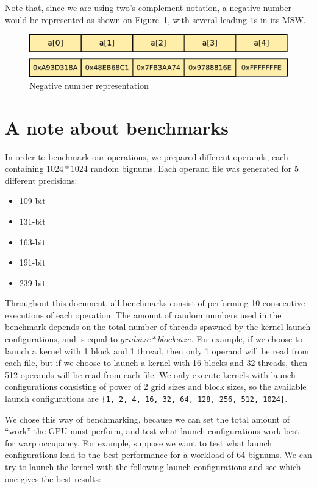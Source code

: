 \documentclass[10pt, a4paper]{report}
\begin{document}
Note that, since we are using two's complement notation, a negative number would
be represented as shown on Figure~\ref{fig:negative_number_representation}, with
several leading \verb+1+s in its MSW.

\begin{figure}[h]
\centering
\includegraphics[scale=0.5]{figs/negative_number_representation}
\caption{Negative number representation}
\label{fig:negative_number_representation}
\end{figure}

\section{A note about benchmarks}
In order to benchmark our operations, we prepared different operands, each
containing $1024*1024$ random bignums.
Each operand file was generated for 5 different precisions:

\begin{itemize}
\item 109-bit
\item 131-bit
\item 163-bit
\item 191-bit
\item 239-bit
\end{itemize}

Throughout this document, all benchmarks consist of performing 10 consecutive
executions of each operation.
The amount of random numbers used in the benchmark depends on the total number
of threads spawned by the kernel launch configurations, and is equal to
$gridsize*blocksize$.
For example, if we choose to launch a kernel with 1 block and 1 thread, then
only 1 operand will be read from each file, but if we choose to launch a kernel
with 16 blocks and 32 threads, then 512 operands will be read from each file.
We only execute kernels with launch configurations consisting of power of 2
grid sizes and block sizes, so the available launch configurations are
\verb+{1, 2, 4, 16, 32, 64, 128, 256, 512, 1024}+.

We chose this way of benchmarking, because we can set the total amount of
``work'' the GPU must perform, and test what launch configurations work best for
warp occupancy.
For example, suppose we want to test what launch configurations lead to the best
performance for a workload of 64 bignums.
We can try to launch the kernel with the following launch configurations and see
which one gives the best results:
\end{document}
